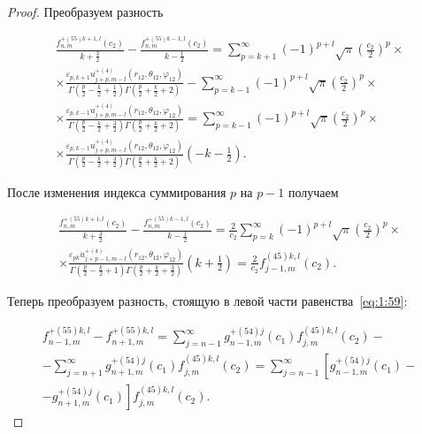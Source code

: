 \begin{russian}
\begin{proof}
Преобразуем разность

\begin{multline}\label{eq:1:61}
\frac{{f_{n,m}^{ + (55)k + 1,l}({c_2})}}{{k + \frac{3}{2}}} - \frac{{f_{n,m}^{ + (55)k - 1,l}({c_2})}}{{k - \frac{1}{2}}} = \sum\limits_{p = k + 1}^\infty  {{{( - 1)}^{p + l}}} \sqrt \pi  {\left( {\frac{{{c_2}}}{2}} \right)^p} \times \\
\times \frac{{{\varepsilon _{p,k + 1}}u_{j + p,m - l}^{ + (4)}\left( {{r_{12}},{\theta _{12}},{\varphi _{12}}} \right)}}{{\Gamma \left( {\frac{p}{2} - \frac{k}{2} + \frac{1}{2}} \right)\Gamma \left( {\frac{p}{2} + \frac{k}{2} + 2} \right)}} - \sum\limits_{p = k - 1}^\infty  {{{( - 1)}^{p + l}}} \sqrt \pi  {\left( {\frac{{{c_2}}}{2}} \right)^p} \times \\
\times \frac{{{\varepsilon _{p,k - 1}}u_{j + p,m - l}^{ + (4)}\left( {{r_{12}},{\theta _{12}},{\varphi _{12}}} \right)}}{{\Gamma \left( {\frac{p}{2} - \frac{k}{2} + \frac{3}{2}} \right)\Gamma \left( {\frac{p}{2} + \frac{k}{2} + 2} \right)}} = \sum\limits_{p = k - 1}^\infty  {{{( - 1)}^{p + l}}} \sqrt \pi  {\left( {\frac{{{c_2}}}{2}} \right)^p} \times \\
\times \frac{{{\varepsilon _{p,k - 1}}u_{j + p,m - l}^{ + (4)}\left( {{r_{12}},{\theta _{12}},{\varphi _{12}}} \right)}}{{\Gamma \left( {\frac{p}{2} - \frac{k}{2} + \frac{3}{2}} \right)\Gamma \left( {\frac{p}{2} + \frac{k}{2} + 2} \right)}}\left( { - k - \frac{1}{2}} \right).
\end{multline}

После изменения индекса суммирования $p$ на $p-1$ получаем

\begin{multline}\label{eq:1:62}
\frac{{f_{n,m}^{ + (55)k + 1,l}({c_2})}}{{k + \frac{3}{2}}} - \frac{{f_{n,m}^{ + (55)k - 1,l}({c_2})}}{{k - \frac{1}{2}}} = \frac{2}{{{c_2}}}\sum\limits_{p = k}^\infty  {{{( - 1)}^{p + l}}} \sqrt \pi  {\left( {\frac{{{c_2}}}{2}} \right)^p} \times \\
\times \frac{{{\varepsilon _{pk}}u_{j + p - 1,m - l}^{ + (4)}\left( {{r_{12}},{\theta _{12}},{\varphi _{12}}} \right)}}{{\Gamma \left( {\frac{p}{2} - \frac{k}{2} + 1} \right)\Gamma \left( {\frac{p}{2} + \frac{k}{2} + \frac{3}{2}} \right)}}\left( {k + \frac{1}{2}} \right) = \frac{2}{{{c_2}}}f_{j - 1,m}^{(45)k,l}({c_2}).
\end{multline}

Теперь преобразуем разность, стоящую в левой части равенства~\eqref{eq:1:59}:

\begin{multline}\label{eq:1:63}
f_{n - 1,m}^{ + (55)k,l} - f_{n + 1,m}^{ + (55)k,l} = \sum\limits_{j = n - 1}^\infty  {g_{n - 1,m}^{ + (54)j}} ({c_1})f_{j,m}^{(45)k,l}({c_2}) - \\
- \sum\limits_{j = n + 1}^\infty  {g_{n + 1,m}^{ + (54)j}} ({c_1})f_{j,m}^{(45)k,l}({c_2}) = \sum\limits_{j = n - 1}^\infty  {\left[ {g_{n - 1,m}^{ + (54)j}({c_1}) - } \right.} \\
\left. { - g_{n + 1,m}^{ + (54)j}({c_1})} \right]f_{j,m}^{(45)k,l}({c_2}).
\end{multline}


\end{proof}
\end{russian}
